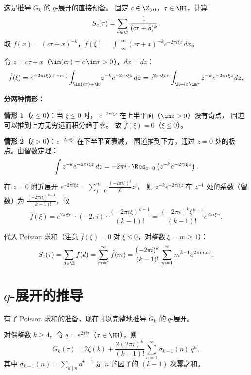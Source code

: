 \begin{example}
\label{ex:poisson-for-eisenstein}
这是推导 $G_k$ 的 $q$-展开的直接预备。
固定 $c \in \Z_{>0}$，$\tau \in \HH$，计算
\[
  S_c(\tau) = \sum_{d \in \Z} \frac{1}{(c\tau + d)^k}.
\]
取 $f(x) = (c\tau + x)^{-k}$，$\hat{f}(\xi) = \int_{-\infty}^{+\infty} (c\tau + x)^{-k} e^{-2\pi i \xi x}\, dx$。

令 $z = c\tau + x$（$\im(c\tau) = c\, \im\tau > 0$），$dx = dz$：
\[
  \hat{f}(\xi)
  = e^{-2\pi i \xi(c\tau - c\tau)} \int_{\im(c\tau) + \R} z^{-k} e^{-2\pi i\xi z}\, dz
  = e^{2\pi i \xi c\tau} \int_{\R + i c\, \im\tau} z^{-k} e^{-2\pi i \xi z}\, dz.
\]

\textbf{分两种情形：}

\textbf{情形 1（$\xi \leq 0$）}：当 $\xi \leq 0$ 时，
$e^{-2\pi i\xi z}$ 在上半平面（$\im z > 0$）没有奇点，
围道可以推到上方无穷远而积分趋于零。
故 $\hat{f}(\xi) = 0$（$\xi \leq 0$）。

\textbf{情形 2（$\xi > 0$）}：$e^{-2\pi i\xi z}$ 在下半平面衰减，
围道推到下方，通过 $z = 0$ 处的极点。由留数定理：
\[
  \int z^{-k} e^{-2\pi i\xi z}\, dz = -2\pi i \cdot \Res_{z=0}\left(z^{-k} e^{-2\pi i\xi z}\right).
\]
在 $z = 0$ 附近展开 $e^{-2\pi i\xi z} = \sum_{j=0}^\infty \frac{(-2\pi i\xi)^j}{j!} z^j$，
则 $z^{-k} e^{-2\pi i\xi z}$ 在 $z^{-1}$ 处的系数（留数）为
$\frac{(-2\pi i\xi)^{k-1}}{(k-1)!}$，故
\[
  \hat{f}(\xi) = e^{2\pi i\xi c\tau} \cdot (-2\pi i) \cdot \frac{(-2\pi i\xi)^{k-1}}{(k-1)!}
  = \frac{(-2\pi i)^k \xi^{k-1}}{(k-1)!} e^{2\pi i\xi c\tau}.
\]

代入 Poisson 求和（注意 $\hat{f}(\xi) = 0$ 对 $\xi \leq 0$，对整数 $\xi = m \geq 1$）：
\[
  S_c(\tau) = \sum_{d \in \Z} f(d) = \sum_{m=1}^{\infty} \hat{f}(m)
  = \frac{(-2\pi i)^k}{(k-1)!} \sum_{m=1}^{\infty} m^{k-1} e^{2\pi i m c\tau}.
\]
\end{example}


\section{$q$-展开的推导}
\label{sec:eisenstein-q-expansion}

有了 Poisson 求和的准备，现在可以完整地推导 $G_k$ 的 $q$-展开。



\begin{theorem}[$G_k$ 的 $q$-展开]
\label{thm:Gk-q-expansion}
对偶整数 $k \geq 4$，令 $q = e^{2\pi i\tau}$（$\tau \in \HH$），则
\[
  G_k(\tau) = 2\zeta(k)
  + \frac{2(2\pi i)^k}{(k-1)!} \sum_{n=1}^{\infty} \sigma_{k-1}(n)\, q^n,
\]
其中 $\sigma_{k-1}(n) = \sum_{d \mid n} d^{k-1}$ 是 $n$ 的因子的 $(k-1)$ 次幂之和。
\end{theorem}

